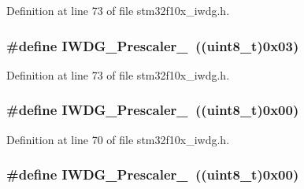 Definition at line 73 of file stm32f10x\+\_\+iwdg.\+h.

\subsubsection[{\texorpdfstring{I\+W\+D\+G\+\_\+\+Prescaler\+\_\+32}{IWDG_Prescaler_32}}]{\setlength{\rightskip}{0pt plus 5cm}\#define I\+W\+D\+G\+\_\+\+Prescaler\+\_~(({\bf uint8\+\_\+t})0x03)}\hypertarget{group___i_w_d_g__prescaler_gaa8b091b6e4102513b1e3a1c4eb6756ba}{}\label{group___i_w_d_g__prescaler_gaa8b091b6e4102513b1e3a1c4eb6756ba}


Definition at line 73 of file stm32f10x\+\_\+iwdg.\+h.

\subsubsection[{\texorpdfstring{I\+W\+D\+G\+\_\+\+Prescaler\+\_\+4}{IWDG_Prescaler_4}}]{\setlength{\rightskip}{0pt plus 5cm}\#define I\+W\+D\+G\+\_\+\+Prescaler\+\_~(({\bf uint8\+\_\+t})0x00)}\hypertarget{group___i_w_d_g__prescaler_ga82a058c196d5a9cd7ea2f2202b394ba0}{}\label{group___i_w_d_g__prescaler_ga82a058c196d5a9cd7ea2f2202b394ba0}


Definition at line 70 of file stm32f10x\+\_\+iwdg.\+h.

\subsubsection[{\texorpdfstring{I\+W\+D\+G\+\_\+\+Prescaler\+\_\+4}{IWDG_Prescaler_4}}]{\setlength{\rightskip}{0pt plus 5cm}\#define I\+W\+D\+G\+\_\+\+Prescaler\+\_~(({\bf uint8\+\_\+t})0x00)}\hypertarget{group___i_w_d_g__prescaler_ga82a058c196d5a9cd7ea2f2202b394ba0}{}\label{group___i_w_d_g__prescaler_ga82a058c196d5a9cd7ea2f2202b394ba0}


